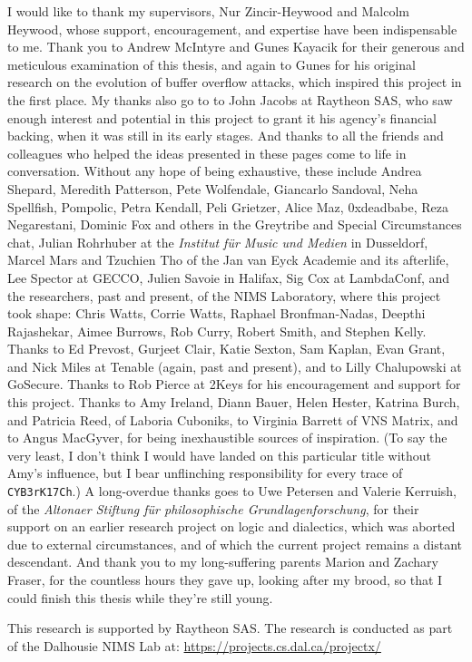 \printnoidxglossaries
\clearpage
{}

\begin{acknowledgements}
I would like to thank my supervisors, Nur Zincir-Heywood and Malcolm Heywood,
whose support, encouragement, and expertise have been indispensable to me. Thank
you to Andrew McIntyre and Gunes Kayacik for their generous and meticulous
examination of this thesis, and again to Gunes for his original research on the
evolution of buffer overflow attacks, which inspired this project in the first
place. My thanks also go to to John Jacobs at Raytheon SAS, who saw enough
interest and potential in this project to grant it his agency's financial
backing, when it was still in its early stages. And thanks to all the friends
and colleagues who helped the ideas presented in these pages come to life in
conversation. Without any hope of being exhaustive, these include Andrea
Shepard, Meredith Patterson, Pete Wolfendale, Giancarlo Sandoval, Neha
Spellfish, Pompolic, Petra Kendall, Peli Grietzer, Alice Maz, 0xdeadbabe, Reza
Negarestani, Dominic Fox and others in the Greytribe and Special Circumstances
chat, Julian Rohrhuber at the \emph{Institut f\"ur Music und Medien} in
Dusseldorf, Marcel Mars and Tzuchien Tho of the Jan van Eyck Academie and its
afterlife, Lee Spector at GECCO, Julien Savoie in Halifax, Sig Cox at
LambdaConf, and the researchers, past and present, of the NIMS Laboratory, where
this project took shape: Chris Watts, Corrie Watts, Raphael Bronfman-Nadas,
Deepthi Rajashekar, Aimee Burrows, Rob Curry, Robert Smith, and Stephen Kelly.
Thanks to Ed Prevost, Gurjeet Clair, Katie Sexton, Sam Kaplan, Evan Grant, and
Nick Miles at Tenable (again, past and present), and to Lilly Chalupowski at
GoSecure. Thanks to Rob Pierce at 2Keys for his encouragement and support for
this project. Thanks to Amy Ireland, Diann Bauer, Helen Hester, Katrina Burch,
and Patricia Reed, of Laboria Cuboniks, to Virginia Barrett of VNS Matrix, and
to Angus MacGyver, for being inexhaustible sources of inspiration. (To say the
very least, I don't think I would have landed on this particular title without
Amy's influence, but I bear unflinching responsibility for every trace of
\texttt{CYB3rK17Ch}.) A
long-overdue thanks goes to Uwe Petersen and Valerie Kerruish, of the
\emph{Altonaer Stiftung für philosophische Grundlagenforschung}, for their
support on an earlier research project on logic and dialectics, which was aborted due to
external circumstances, and of which the current project remains a distant
descendant. And thank you to my long-suffering parents Marion and Zachary
Fraser, for the countless hours they gave up, looking after my brood, so that I
could finish this thesis while they're still young.

This research is supported by Raytheon SAS. The research is conducted
as part of the Dalhousie NIMS Lab at: \url{https://projects.cs.dal.ca/projectx/}
\end{acknowledgements}

\clearpage
\mainmatter